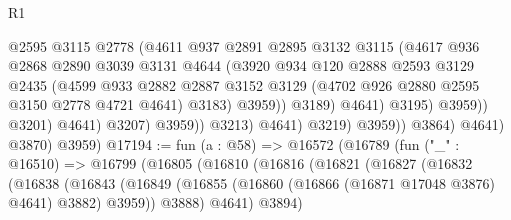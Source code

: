 \begin{lexlean}{R1}
\begin{coremodule}
                                        @2595
                                        @3115
                                        @2778
                                        (@4611
                                          @937
                                          @2891
                                          @2895
                                          @3132
                                          @3115
                                          (@4617
                                            @936
                                            @2868
                                            @2890
                                            @3039
                                            @3131
                                            @4644
                                            (@3920
                                              @934
                                              @120
                                              @2888
                                              @2593
                                              @3129
                                              @2435
                                              (@4599
                                                @933
                                                @2882
                                                @2887
                                                @3152
                                                @3129
                                                (@4702 @926 @2880 @2595 @3150 @2778 @4721 @4641)
                                                @3183)
                                              @3959))
                                          @3189)
                                        @4641)
                                      @3195)
                                    @3959))
                                @3201)
                              @4641)
                            @3207)
                          @3959))
                      @3213)
                    @4641)
                  @3219)
                @3959))
            @3864)
          @4641)
        @3870)
      @3959)
@17194 := fun (a : @58) =>
  @16572
    (@16789
      (fun ("_" : @16510) =>
      @16799
        (@16805
          (@16810
            (@16816
              (@16821
                (@16827
                  (@16832
                    (@16838
                      (@16843
                        (@16849 (@16855 (@16860 (@16866 (@16871 @17048 @3876) @4641) @3882) @3959))
                        @3888)
                      @4641)
                    @3894)

\end{coremodule}
\end{lexlean}
